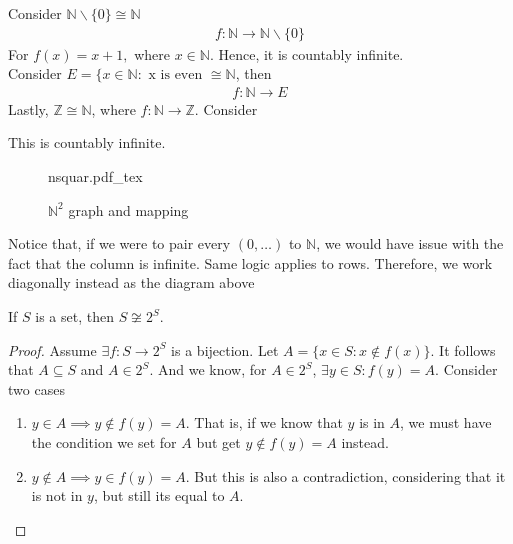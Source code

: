 \documentclass[a4paper]{article}
\newcommand{\incfig}[2][1]{%
	\def\svgwidth{#1\columnwidth}
	{#2.pdf_tex}
}
\theoremstyle{plain}
\newtheorem{thm}{Theorem}[section]
\theoremstyle{definition}
\newtheorem{exmp}{Example}[section]
\theoremstyle{remark}
\begin{document}
\begin{tcolorbox}[colback=black!3!white,colframe=black!60!white,title=\begin{exmp}Examples \label{Examples}\end{exmp}]
Consider $\mathbb{N} \backslash \{ 0 \} \cong \mathbb{N}$
\begin{align}
	f : \mathbb{N} \to \mathbb{N} \backslash \{ 0\}
\end{align}
For $f(x) = x + 1,$ where $x \in \mathbb{N}$. Hence, it is countably infinite. \\

Consider $E = \{ x \in \mathbb{N}: \text{ x is even } \cong \mathbb{N}$, then
	\begin{align}
		f: \mathbb{N} \to  E 
	\end{align}
	Lastly, $\mathbb{Z} \cong \mathbb{N}$, where $f: \mathbb{N} \to  \mathbb{Z}$.
	Consider
\end{tcolorbox}
\begin{tcolorbox}[colback=black!3!white,colframe=black!60!white,title=\begin{thm}$\mathbb{N}^2 \cong \mathbb{N}$ \label{finite countability of nsquared}\end{thm}]
This is countably infinite.
\begin{figure}[H]
	\centering
	\incfig{nsquar}
	\caption{$\mathbb{N}^2$ graph and mapping}
	\label{fig:nsquar}
\end{figure}
Notice that, if we were to pair every $(0,\ldots)$ to $\mathbb{N}$, we would have issue with the fact that the column is infinite. Same logic applies to rows. Therefore, we work diagonally instead as the diagram above
\end{tcolorbox}
\begin{tcolorbox}[colback=black!3!white,colframe=black!60!white,title=\begin{thm}Powerset Isomorphism \label{Powerset Isomorphism}\end{thm}]
If $S$ is a set, then $S \not\cong 2^{S}$. 
\begin{proof}
	Assume $\exists f : S \to 2^{S}$ is a bijection.
	Let $A = \{ x \in S : x \not\in f(x)\}$.
	It follows that $A \subseteq S$ and $A \in 2^{S}$. And we know, for $A \in 2^{S}$, $\exists y \in S : f(y) = A$. Consider two cases
	\begin{enumerate}
		\item $y \in A \implies y \not\in f(y) = A$. That is, if we know that $y$ is in $A$, we must have the condition we set for $A$ but get $y \not\in f(y) =A$ instead.
		\item $y \not\in A \implies y \in f(y) = A$. But this is also a contradiction, considering that it is not in $y$, but still its equal to $A$.
	\end{enumerate}
\end{proof}
\end{tcolorbox}
\end{document}
